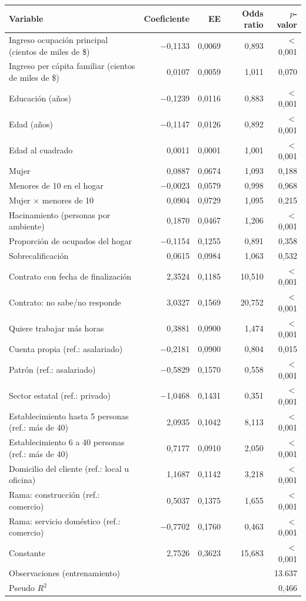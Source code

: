 \begin{tabular}{lrrrr}
\toprule
Variable & Coeficiente & EE & Odds ratio & $p$-valor \\
\midrule
Ingreso ocupación principal (cientos de miles de \$) & $-$0,1133 & 0,0069 & 0,893 & $<$0,001 \\
Ingreso per cápita familiar (cientos de miles de \$) & 0,0107 & 0,0059 & 1,011 & 0,070 \\
Educación (años) & $-$0,1239 & 0,0116 & 0,883 & $<$0,001 \\
Edad (años) & $-$0,1147 & 0,0126 & 0,892 & $<$0,001 \\
Edad al cuadrado & 0,0011 & 0,0001 & 1,001 & $<$0,001 \\
Mujer & 0,0887 & 0,0674 & 1,093 & 0,188 \\
Menores de 10 en el hogar & $-$0,0023 & 0,0579 & 0,998 & 0,968 \\
Mujer $\times$ menores de 10 & 0,0904 & 0,0729 & 1,095 & 0,215 \\
Hacinamiento (personas por ambiente) & 0,1870 & 0,0467 & 1,206 & $<$0,001 \\
Proporción de ocupados del hogar & $-$0,1154 & 0,1255 & 0,891 & 0,358 \\
Sobrecalificación & 0,0615 & 0,0984 & 1,063 & 0,532 \\
Contrato con fecha de finalización & 2,3524 & 0,1185 & 10,510 & $<$0,001 \\
Contrato: no sabe/no responde & 3,0327 & 0,1569 & 20,752 & $<$0,001 \\
Quiere trabajar más horas & 0,3881 & 0,0900 & 1,474 & $<$0,001 \\
Cuenta propia (ref.: asalariado) & $-$0,2181 & 0,0900 & 0,804 & 0,015 \\
Patrón (ref.: asalariado) & $-$0,5829 & 0,1570 & 0,558 & $<$0,001 \\
Sector estatal (ref.: privado) & $-$1,0468 & 0,1431 & 0,351 & $<$0,001 \\
Establecimiento hasta 5 personas (ref.: más de 40) & 2,0935 & 0,1042 & 8,113 & $<$0,001 \\
Establecimiento 6 a 40 personas (ref.: más de 40) & 0,7177 & 0,0910 & 2,050 & $<$0,001 \\
Domicilio del cliente (ref.: local u oficina) & 1,1687 & 0,1142 & 3,218 & $<$0,001 \\
Rama: construcción (ref.: comercio) & 0,5037 & 0,1375 & 1,655 & $<$0,001 \\
Rama: servicio doméstico (ref.: comercio) & $-$0,7702 & 0,1760 & 0,463 & $<$0,001 \\
Constante & 2,7526 & 0,3623 & 15,683 & $<$0,001 \\
\midrule
Observaciones (entrenamiento) & \multicolumn{4}{r}{13.637} \\
Pseudo $R^2$ & \multicolumn{4}{r}{0,466} \\
\bottomrule
\end{tabular}